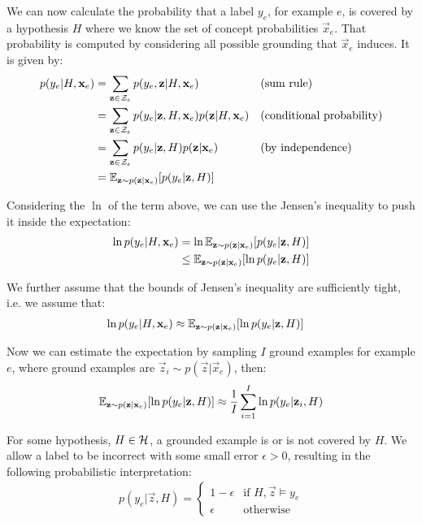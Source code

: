 We can now calculate the probability that a label $y_e$, for example $e$, is covered by a hypothesis $H$ where we know the set of concept probabilities $\vec{x}_e$.
That probability is computed by considering all possible grounding that $\vec{x}_e$ induces.
It is given by:
\begin{align}
p(y_e|H, \textbf{x}_e)
& = \sum_{\textbf{z} \in \mathcal{Z}_e} p(y_e, \textbf{z} | H, \textbf{x}_e) && \text{(sum rule)} \nonumber \\
& = \sum_{\textbf{z} \in \mathcal{Z}_e} p(y_e | \textbf{z}, H, \textbf{x}_e) p(\textbf{z} | H, \textbf{x}_e) && \text{(conditional probability)} \nonumber \\
& = \sum_{\textbf{z} \in \mathcal{Z}_e} p(y_e | \textbf{z}, H) p(\textbf{z}| \textbf{x}_e) && \text{(by independence)} \nonumber \\
& = \mathbb{E}_{\textbf{z} \sim p(\textbf{z}| \textbf{x}_e)}[p(y_e|\textbf{z},H)] \label{ex6.5}
\end{align}

Considering the $\ln$ of the term above, we can use the Jensen's inequality to push it inside the expectation:
\begin{align}
\ln p(y_e|H, \textbf{x}_e)
&= \ln \mathbb{E}_{\textbf{z} \sim p(\textbf{z}| \textbf{x}_e)}[p(y_e|\textbf{z},H)] \nonumber \\
&\leq \mathbb{E}_{\textbf{z} \sim p(\textbf{z}| \textbf{x}_e)}[\ln  p(y_e|\textbf{z},H)] 
\nonumber \\
\end{align}

We further assume that the bounds of Jensen's inequality are sufficiently tight, i.e. we assume that:
\begin{align}
\ln p(y_e|H, \textbf{x}_e)
&\approx \mathbb{E}_{\textbf{z} \sim p(\textbf{z}| \textbf{x}_e)}[\ln  p(y_e|\textbf{z},H)] \label{jensen-approx}
\end{align}

Now we can estimate the expectation by sampling $I$ ground examples for example $e$, where ground examples are $\vec{z}_{i} \sim p(\vec{z}| \vec{x}_e)$, then:
\begin{align}
\mathbb{E}_{\textbf{z} \sim p(\textbf{z}| \textbf{x}_e)}[\ln  p(y_e|\textbf{z},H)]
\approx \frac{1}{I} \sum_{i=1}^{I} \ln  p(y_e|\textbf{z}_i,H) \label{sampling-result}
\end{align}


For some hypothesis, $H\in \mathcal{H}$, a grounded example is or is not covered by $H$. We allow a label to be incorrect with some small error $\epsilon > 0$, resulting in the following probabilistic interpretation:
\begin{align}
p(y_e | \vec{z}, H) =
\begin{cases}
1 - \epsilon & \text{if } H, \vec{z} \models y_e \\
\epsilon & \text{otherwise}
\label{def-ground}
\end{cases}
\end{align}

